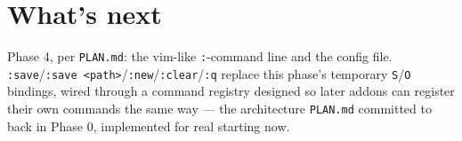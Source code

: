 \documentclass[11pt]{article}
\begin{document}
\section{What's next}
Phase 4, per \texttt{PLAN.md}: the vim-like \texttt{:}-command line and the config file.
\texttt{:save}/\texttt{:save <path>}/\texttt{:new}/\texttt{:clear}/\texttt{:q} replace this
phase's temporary \texttt{S}/\texttt{O} bindings, wired through a command registry
designed so later addons can register their own commands the same way — the architecture
\texttt{PLAN.md} committed to back in Phase 0, implemented for real starting now.
\end{document}
